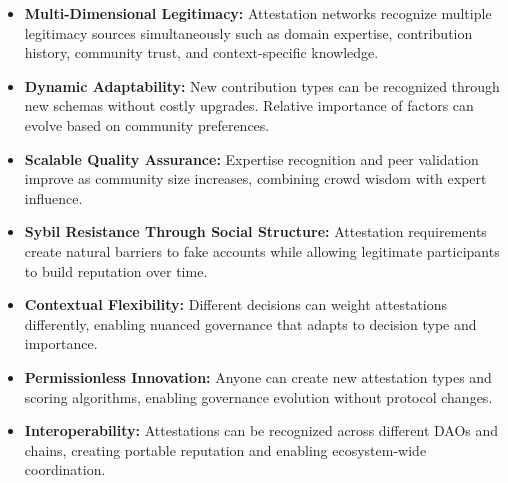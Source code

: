 \begin{itemize}
\item \textbf{Multi-Dimensional Legitimacy:} Attestation networks recognize multiple legitimacy sources simultaneously such as domain expertise, contribution history, community trust, and context-specific knowledge.
\item \textbf{Dynamic Adaptability:} New contribution types can be recognized through new schemas without costly upgrades. Relative importance of factors can evolve based on community preferences.
\item \textbf{Scalable Quality Assurance:} Expertise recognition and peer validation improve as community size increases, combining crowd wisdom with expert influence.
\item \textbf{Sybil Resistance Through Social Structure:} Attestation requirements create natural barriers to fake accounts while allowing legitimate participants to build reputation over time.
\item \textbf{Contextual Flexibility:} Different decisions can weight attestations differently, enabling nuanced governance that adapts to decision type and importance.
\item \textbf{Permissionless Innovation:} Anyone can create new attestation types and scoring algorithms, enabling governance evolution without protocol changes.
\item \textbf{Interoperability:} Attestations can be recognized across different DAOs and chains, creating portable reputation and enabling ecosystem-wide coordination.
\end{itemize}
